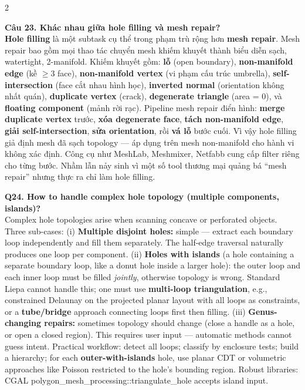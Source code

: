 \begin{paracol}{2}
\switchcolumn

\textbf{Câu 23. Khác nhau giữa hole filling và mesh repair?}\\
\textbf{Hole filling} là một subtask cụ thể trong phạm trù rộng hơn \textbf{mesh repair}. Mesh repair bao gồm mọi thao tác chuyển mesh khiếm khuyết thành biểu diễn sạch, watertight, 2-manifold. Khiếm khuyết gồm: \textbf{lỗ} (open boundary), \textbf{non-manifold edge} (kề $\ge 3$ face), \textbf{non-manifold vertex} (vi phạm cấu trúc umbrella), \textbf{self-intersection} (face cắt nhau hình học), \textbf{inverted normal} (orientation không nhất quán), \textbf{duplicate vertex} (crack), \textbf{degenerate triangle} (area = 0), và \textbf{floating component} (mảnh rời rạc). Pipeline mesh repair điển hình: \textbf{merge duplicate vertex} trước, \textbf{xóa degenerate face}, \textbf{tách non-manifold edge}, \textbf{giải self-intersection}, \textbf{sửa orientation}, rồi \textbf{vá lỗ} bước cuối. Vì vậy hole filling giả định mesh đã sạch topology — áp dụng trên mesh non-manifold cho hành vi không xác định. Công cụ như MeshLab, Meshmixer, Netfabb cung cấp filter riêng cho từng bước. Nhầm lẫn nảy sinh vì một số tool thương mại quảng bá ``mesh repair'' nhưng thực ra chỉ làm hole filling.

\switchcolumn*

\textbf{Q24. How to handle complex hole topology (multiple components, islands)?}\\
Complex hole topologies arise when scanning concave or perforated objects. Three sub-cases: (i) \textbf{Multiple disjoint holes:} simple — extract each boundary loop independently and fill them separately. The half-edge traversal naturally produces one loop per component. (ii) \textbf{Holes with islands} (a hole containing a separate boundary loop, like a donut hole inside a larger hole): the outer loop and each inner loop must be filled \emph{jointly}, otherwise topology is wrong. Standard Liepa cannot handle this; one must use \textbf{multi-loop triangulation}, e.g., constrained Delaunay on the projected planar layout with all loops as constraints, or a \textbf{tube/bridge} approach connecting loops first then filling. (iii) \textbf{Genus-changing repairs:} sometimes topology should change (close a handle as a hole, or open a closed region). This requires user input — automatic methods cannot guess intent. Practical workflow: detect all loops; classify by enclosure tests; build a hierarchy; for each \textbf{outer-with-islands} hole, use planar CDT or volumetric approaches like Poisson restricted to the hole's bounding region. Robust libraries: CGAL polygon\_mesh\_processing::triangulate\_hole accepts island input.


\end{paracol}
